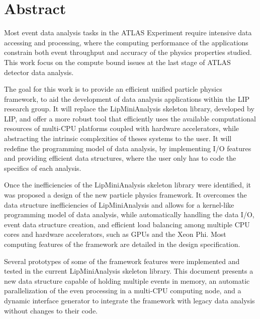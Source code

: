 \chapter*{Abstract}
\label{abstract}

Most event data analysis tasks in the ATLAS Experiment require intensive data accessing and processing, where the computing performance of the applications constrain both event throughput and accuracy of the physics properties studied. This work focus on the compute bound issues at the last stage of ATLAS detector data analysis.

The goal for this work is to provide an efficient unified particle physics framework, to aid the development of data analysis applications within the LIP research group. It will replace the LipMiniAnalysis skeleton library, developed by LIP, and offer a more robust tool that efficiently uses the available computational resources of multi-CPU platforms coupled with hardware accelerators, while abstracting the intrinsic complexities of theses systems to the user. It will redefine the programming model of data analysis, by implementing I/O features and providing efficient data structures, where the user only has to code the specifics of each analysis.

Once the inefficiencies of the LipMiniAnalysis skeleton library were identified, it was proposed a design of the new particle physics framework. It overcomes the data structure inefficiencies of LipMiniAnalysis and allows for a kernel-like programming model of data analysis, while automatically handling the data I/O, event data structure creation, and efficient load balancing among multiple CPU cores and hardware accelerators, such as GPUs and the \intel Xeon Phi. Most computing features of the framework are detailed in the design specification.

Several prototypes of some of the framework features were implemented and tested in the current LipMiniAnalysis skeleton library. This document presents a new data structure capable of holding multiple events in memory, an automatic parallelization of the even processing in a multi-CPU computing node, and a dynamic interface generator to integrate the framework with legacy data analysis without changes to their code.
